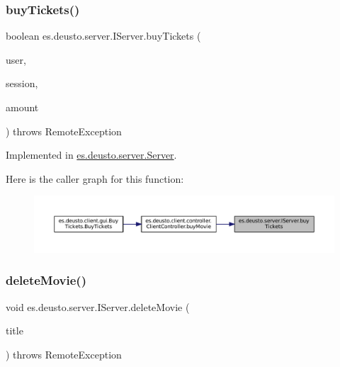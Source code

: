 \subsubsection{\texorpdfstring{buyTickets()}{buyTickets()}}
{\footnotesize\ttfamily boolean es.\+deusto.\+server.\+I\+Server.\+buy\+Tickets (\begin{DoxyParamCaption}\item[{\mbox{\hyperlink{classes_1_1deusto_1_1server_1_1data_1_1_user_d_t_o}{User\+D\+TO}}}]{user,  }\item[{\mbox{\hyperlink{classes_1_1deusto_1_1server_1_1data_1_1_session_d_t_o}{Session\+D\+TO}}}]{session,  }\item[{int}]{amount }\end{DoxyParamCaption}) throws Remote\+Exception}



Implemented in \mbox{\hyperlink{classes_1_1deusto_1_1server_1_1_server_a3bbf9f19774d2fae5c831cfac1f2306c}{es.\+deusto.\+server.\+Server}}.

Here is the caller graph for this function\+:
\nopagebreak
\begin{figure}[H]
\begin{center}
\leavevmode
\includegraphics[width=350pt]{interfacees_1_1deusto_1_1server_1_1_i_server_ac3302c01fefc37a32c0bcbf79fcce44b_icgraph}
\end{center}
\end{figure}
\mbox{\label{interfacees_1_1deusto_1_1server_1_1_i_server_a0b3243dc04d49f7659fefec4e4fb43b7}} 
\subsubsection{\texorpdfstring{deleteMovie()}{deleteMovie()}\hspace{0.1cm}{\footnotesize\ttfamily [1/2]}}
{\footnotesize\ttfamily void es.\+deusto.\+server.\+I\+Server.\+delete\+Movie (\begin{DoxyParamCaption}\item[{String}]{title }\end{DoxyParamCaption}) throws Remote\+Exception}



